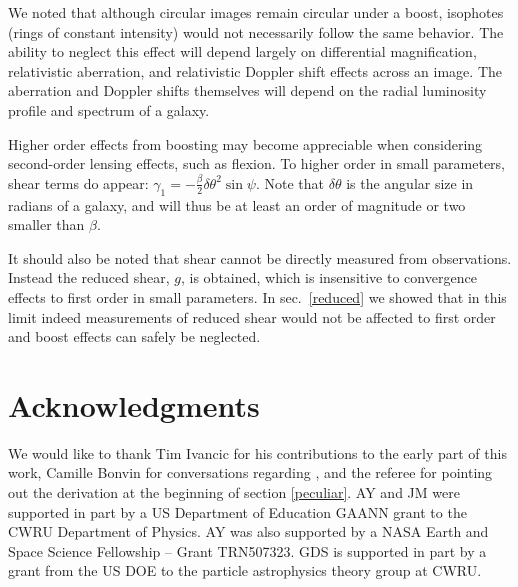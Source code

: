 \documentclass[useAMS,fleqn, usenatbib]{mn2e}
\begin{document}
We noted that although circular images remain circular under a boost, isophotes 
(rings of constant intensity) would not necessarily follow the same behavior. 
The ability to neglect this effect will depend largely on differential 
magnification, relativistic aberration, and relativistic Doppler shift effects 
across an image.  The aberration and Doppler shifts themselves will depend 
on the radial luminosity profile and spectrum of a galaxy.

Higher order effects from boosting may become appreciable when considering 
second-order lensing effects, such as flexion.  To
higher order in small parameters, shear terms do 
appear: $\gamma_{1}=-\frac{\beta}{2}\delta\theta^{2}\sin\psi$.
Note that $\delta\theta$ is the angular size in radians of a galaxy, and 
will thus be at least an order of magnitude or two smaller than $\beta$.

It should also be noted that shear cannot be directly measured from observations.
Instead the reduced shear, $g$, is obtained, which is
insensitive to convergence effects to first order in small parameters.
In sec.~\ref{reduced} we showed that in this limit indeed measurements
of reduced shear would not be affected to first order and boost effects can 
safely be neglected. 


\section*{Acknowledgments}
We would like to thank Tim Ivancic for his contributions to the early part of this work, Camille Bonvin for conversations regarding \citep{Bonvin:2008ni}, and the referee for pointing out the derivation at the beginning of section \ref{peculiar}.
AY and JM were supported in part by a US Department of Education GAANN grant to the CWRU Department of Physics.  AY was also supported by a NASA Earth and Space Science Fellowship -- Grant TRN507323.
GDS is supported in part by a grant from the US DOE to the particle astrophysics theory group at CWRU.  


\end{document}

